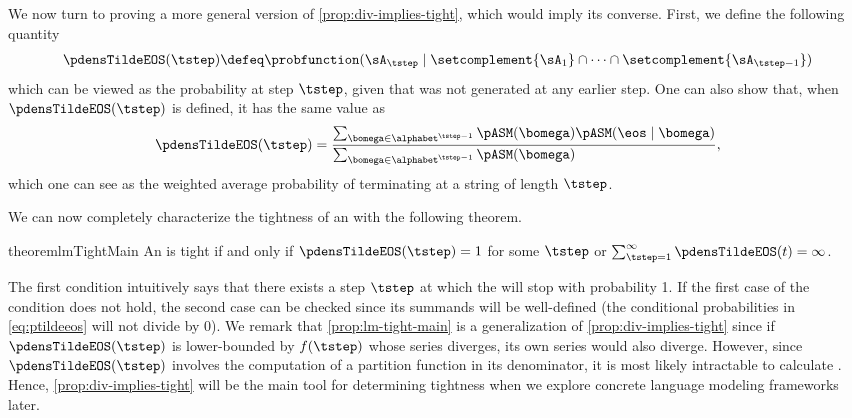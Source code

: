 We now turn to proving a more general version of \cref{prop:div-implies-tight}, which would imply its converse. 
First, we define the following quantity
\begin{align}\label{eq:ptildeeos-set}
\pdensTildeEOS(\tstep)\defeq\probfunction(\sA_\tstep\mid \setcomplement{\sA_1}\cap \dotsm \cap \setcomplement{\sA_{\tstep-1}})
\end{align}
which can be viewed as the \eos probability at step $\tstep$, given that \eos was not generated at any earlier step. 
One can also show that, when $\pdensTildeEOS(\tstep)$ is defined, it has the same value as
\begin{align}\label{eq:ptildeeos}
\pdensTildeEOS(\tstep)=\frac{
    \sum_{\bomega\in \alphabet^{\tstep-1}} \pASM(\bomega)\pASM(\eos\mid\bomega)}
    {\sum_{\bomega\in \alphabet^{\tstep-1}} \pASM(\bomega)\phantom{\pASM(\eos\mid\bomega)}},
\end{align}
which one can see as the weighted average probability of terminating at a string of length $\tstep$.

We can now completely characterize the tightness of an \autoregmodelAcronym with the following theorem.
\begin{restatable}{theorem}{lmTightMain} \label{prop:lm-tight-main}
An \autoregmodel is tight if and only if $\pdensTildeEOS(\tstep)=1$ for some $\tstep$ or $\sum_{\tstep=1}^\infty \pdensTildeEOS(t)=\infty$.
\end{restatable}
The first condition intuitively says that there exists a step $\tstep$ at which the \autoregmodelAcronym will stop with probability 1.
If the first case of the condition does not hold, the second case can be checked since its summands will be well-defined (the conditional probabilities in \cref{eq:ptildeeos} will not divide by $0$).
We remark that \cref{prop:lm-tight-main} is a generalization of \cref{prop:div-implies-tight} since if $\pdensTildeEOS(\tstep)$ is lower-bounded by $f(\tstep)$ whose series diverges, its own series would also diverge. 
However, since $\pdensTildeEOS(\tstep)$ involves the computation of a partition function in its denominator, it is most likely intractable to calculate \citep{Lin2021, Lin2022}. 
Hence, \cref{prop:div-implies-tight} will be the main tool for determining tightness when we explore concrete language modeling frameworks later.
                
